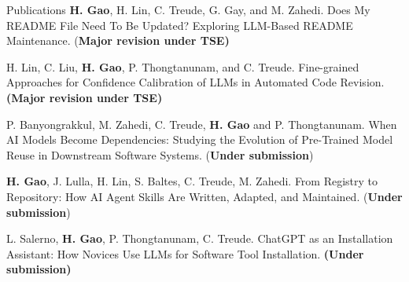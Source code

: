 \documentclass{resume}
\begin{document}
\begin{rSection}{Publications}
    \textbf{H. Gao}, H. Lin, C. Treude, G. Gay, and M. Zahedi. Does My README File Need To Be Updated? Exploring LLM-Based README Maintenance. (\textbf{Major revision under TSE)}

    H. Lin, C. Liu, \textbf{H. Gao}, P. Thongtanunam, and C. Treude. Fine-grained Approaches for Confidence Calibration of LLMs in Automated Code Revision. \textbf{(Major revision under TSE)}
    
     P. Banyongrakkul, M. Zahedi, C. Treude, \textbf{H. Gao} and P. Thongtanunam. When AI Models Become Dependencies: Studying the Evolution of Pre-Trained Model Reuse in Downstream Software Systems. (\textbf{Under submission})

    \textbf{H. Gao}, J. Lulla, H. Lin, S. Baltes, C. Treude, M. Zahedi. From Registry to Repository: How AI Agent Skills Are Written, Adapted, and Maintained. (\textbf{Under submission})
     

    L. Salerno, \textbf{H. Gao}, P. Thongtanunam, C. Treude. ChatGPT as an Installation Assistant: How Novices Use LLMs for Software Tool Installation. \textbf{(Under submission)}

\end{rSection}
\end{document}
